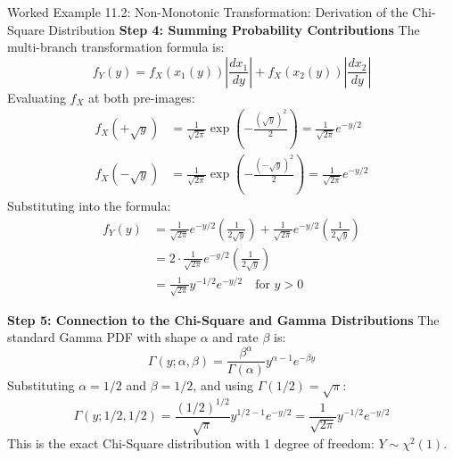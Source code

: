 \begin{examplebox}[breakable]{Worked Example 11.2: Non-Monotonic Transformation: Derivation of the Chi-Square Distribution}
\textbf{Step 4: Summing Probability Contributions}
The multi-branch transformation formula is:
\begin{equation}
f_Y(y) = f_X(x_1(y))\left| \frac{dx_1}{dy} \right| + f_X(x_2(y))\left| \frac{dx_2}{dy} \right|
\end{equation}
Evaluating $f_X$ at both pre-images:
\begin{align}
f_X(+\sqrt{y}) &= \frac{1}{\sqrt{2\pi}} \exp\left( -\frac{(\sqrt{y})^2}{2} \right) = \frac{1}{\sqrt{2\pi}} e^{-y/2} \\
f_X(-\sqrt{y}) &= \frac{1}{\sqrt{2\pi}} \exp\left( -\frac{(-\sqrt{y})^2}{2} \right) = \frac{1}{\sqrt{2\pi}} e^{-y/2}
\end{align}
Substituting into the formula:
\begin{align}
f_Y(y) &= \frac{1}{\sqrt{2\pi}} e^{-y/2} \left( \frac{1}{2\sqrt{y}} \right) + \frac{1}{\sqrt{2\pi}} e^{-y/2} \left( \frac{1}{2\sqrt{y}} \right) \nonumber \\
&= 2 \cdot \frac{1}{\sqrt{2\pi}} e^{-y/2} \left( \frac{1}{2\sqrt{y}} \right) \nonumber \\
&= \frac{1}{\sqrt{2\pi}} y^{-1/2} e^{-y/2} \quad \text{for } y > 0
\end{align}

\textbf{Step 5: Connection to the Chi-Square and Gamma Distributions}
The standard Gamma PDF with shape $\alpha$ and rate $\beta$ is:
\begin{equation}
\Gamma(y; \alpha, \beta) = \frac{\beta^\alpha}{\Gamma(\alpha)} y^{\alpha - 1} e^{-\beta y}
\end{equation}
Substituting $\alpha = 1/2$ and $\beta = 1/2$, and using $\Gamma(1/2) = \sqrt{\pi}$:
\begin{equation}
\Gamma(y; 1/2, 1/2) = \frac{(1/2)^{1/2}}{\sqrt{\pi}} y^{1/2 - 1} e^{-y/2} = \frac{1}{\sqrt{2\pi}} y^{-1/2} e^{-y/2}
\end{equation}
This is the exact Chi-Square distribution with 1 degree of freedom: $Y \sim \chi^2(1)$.
\end{examplebox}

